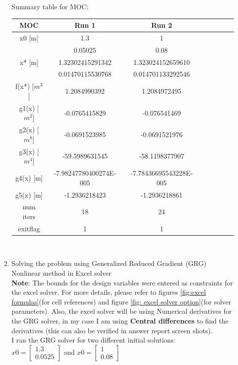 \documentclass[12pt]{article}
\begin{document}
\begin{enumerate}[I]
\begin{enumerate}[1)]
\newpage
Summary table for MOC:\\

\begin{tabular}{|c|c|c|c|c|c|c|c|}
\hline 
MOC &	Run 1 &	Run 2\\
\hline
x0 [m]&	1.3&	1\\

	&0.05025&   0.08\\
\hline	
x* [m]&	1.32302415291342&	1.323024152659610\\
	&0.01470115530768&	0.014701133292546\\
\hline
f(x*) [$m^3$]&	1.2084990392&	1.2084972495\\
\hline
g1(x) [$m^2$]&	-0.0765415829&	-0.076541469\\
g2(x) [$m^8$]	&-0.0691523985&	-0.0691521976\\
g3(x) [$m^4$]&	-59.5989631545&	-58.1198377907\\
g4(x) [m]	&-7.98247780400274E-005&	-7.78436695543228E-005\\
g5(x) [m]	&-1.2936218423&	-1.2936218861\\
\hline
num iters&	18&	24\\
\hline
exitflag&	1&	1\\
\hline
\end{tabular}\\


\item Solving the problem using Generalized Reduced Gradient (GRG) Nonlinear method in Excel solver\\

\textbf{Note}: The bounds for the design variables were entered as constraints for the excel solver. For more details, please refer to figures \ref{fig:excel formulas}(for cell references) and figure \ref{fig: excel solver option}(for solver parameters). Also, the excel solver will be using Numerical derivatives for the GRG solver, in my case I am using \textbf{Central differences} to find the derivatives (this can also be verified in answer report screen shots).\\

I ran the GRG solver for two different initial solutions:\\

$x0=\begin{bmatrix} 1.3\\ 0.0525\end{bmatrix}$ and $x0=\begin{bmatrix} 1\\ 0.08\end{bmatrix}$


\end{enumerate}
\end{enumerate}
\end{document}
